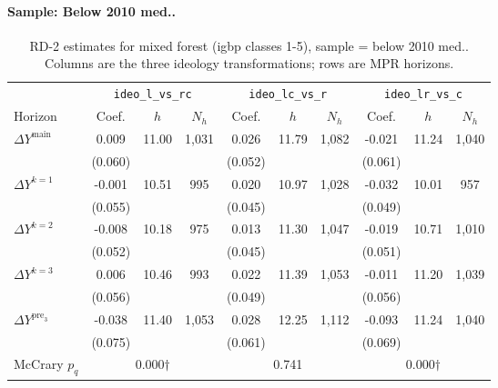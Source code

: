\documentclass[11pt]{article}
\begin{document}
\paragraph{Sample: Below 2010 med..}
\begin{table}[H]
\centering
\scriptsize
\caption{RD-2 estimates for mixed forest (igbp classes 1-5), sample = below 2010 med..
Columns are the three ideology transformations; rows are MPR horizons.}
\label{tab:rd2_mixed_forest_below}
\begin{tabular}{l ccc ccc ccc}
\toprule
 & \multicolumn{3}{c}{\texttt{ideo\_l\_vs\_rc}}
 & \multicolumn{3}{c}{\texttt{ideo\_lc\_vs\_r}}
 & \multicolumn{3}{c}{\texttt{ideo\_lr\_vs\_c}} \\
\cmidrule(lr){2-4} \cmidrule(lr){5-7} \cmidrule(lr){8-10}
Horizon & Coef. & $h$ & $N_h$ & Coef. & $h$ & $N_h$ & Coef. & $h$ & $N_h$ \\
\midrule
$\Delta Y^{\text{main}}$ & 0.009 & 11.00 & 1,031 & 0.026 & 11.79 & 1,082 & -0.021 & 11.24 & 1,040 \\
 & (0.060) &  &  & (0.052) &  &  & (0.061) &  &  \\
\addlinespace[1pt]
$\Delta Y^{k=1}$ & -0.001 & 10.51 & 995 & 0.020 & 10.97 & 1,028 & -0.032 & 10.01 & 957 \\
 & (0.055) &  &  & (0.045) &  &  & (0.049) &  &  \\
\addlinespace[1pt]
$\Delta Y^{k=2}$ & -0.008 & 10.18 & 975 & 0.013 & 11.30 & 1,047 & -0.019 & 10.71 & 1,010 \\
 & (0.052) &  &  & (0.045) &  &  & (0.051) &  &  \\
\addlinespace[1pt]
$\Delta Y^{k=3}$ & 0.006 & 10.46 & 993 & 0.022 & 11.39 & 1,053 & -0.011 & 11.20 & 1,039 \\
 & (0.056) &  &  & (0.049) &  &  & (0.056) &  &  \\
\addlinespace[1pt]
$\Delta Y^{\text{pre}_3}$ & -0.038 & 11.40 & 1,053 & 0.028 & 12.25 & 1,112 & -0.093 & 11.24 & 1,040 \\
 & (0.075) &  &  & (0.061) &  &  & (0.069) &  &  \\
\addlinespace[1pt]
\midrule
McCrary $p_q$ & \multicolumn{3}{c}{0.000$\dagger$} & \multicolumn{3}{c}{0.741} & \multicolumn{3}{c}{0.000$\dagger$} \\
\bottomrule
\end{tabular}
\end{table}
\end{document}
